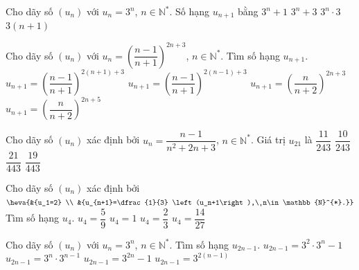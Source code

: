 \begin{ex}%
	Cho dãy số $\left(u_n \right)$ với $u_n=3^n$, $n\in  \mathbb{N}^{*}$. Số hạng $u_{n+1}$ bằng
	 \choice
		 {$3^n+1$}
		 {$3^n+3$}
		 {\True $3^n\cdot3$}
		 {$3(n+1)$}
\end{ex}

\begin{ex}%
	Cho dãy số $\left(u_n \right)$ với $u_n=\left(\dfrac{n-1}{n+1} \right)^{2n+3}$, $n\in  \mathbb{N}^{*}$. Tìm số hạng $u_{n+1}$.
	\choice 
		{$u_{n+1}=\left(\dfrac{n-1}{n+1} \right)^{2\left(n+1\right)+3}$} 
		{$u_{n+1}=\left(\dfrac{n-1}{n+1} \right)^{2\left(n-1\right)+3}$} 
		 {$u_{n+1}=\left(\dfrac{n}{n+2} \right)^{2n+3}$}
		{\True $u_{n+1}=\left(\dfrac{n}{n+2} \right)^{2n+5}$} 
\end{ex}

\begin{ex}%
	Cho  dãy số $\left(u_n \right)$ xác định bởi $u_n=\dfrac{n-1}{n^2+2n+3}$, $n\in\mathbb{N}^*$. Giá trị $u_{21}$ là
	\choice 
		 {$\dfrac{11}{243}$}
		{\True  $\dfrac{10}{243}$}
		 {$\dfrac{21}{443}$}
		{$\dfrac{19}{443}$} 
\end{ex}

\begin{ex}%
	Cho  dãy số $\left(u_n \right)$ xác định bởi $\heva{&{u_1=2} \\
	&{u_{n+1}=\dfrac{1}{3} \left(u_n+1\right),\ n\in\mathbb{N}^{*}.}}$ Tìm  số hạng $u_4$.
	\choice 
		{\True $u_4=\dfrac{5}{9}$} 
		{$u_4=1$} 
		 {$u_4=\dfrac{2}{3}$}
		 {$u_4=\dfrac{14}{27}$}
\end{ex}

\begin{ex}%
	 Cho dãy số $\left(u_n \right)$ với $u_n=3^n$, $n\in \mathbb{N}^{*}$. Tìm số hạng $u_{2n-1}$.
	 \choice
		 {$u_{2n-1}=3^2\cdot3^n-1$}
		{\True $u_{2n-1}=3^n\cdot3^{n-1}$} 
		{$u_{2n-1}=3^{2n}-1$} 
		 {$u_{2n-1}=3^{2\left(n-1\right)}$}
\end{ex}

